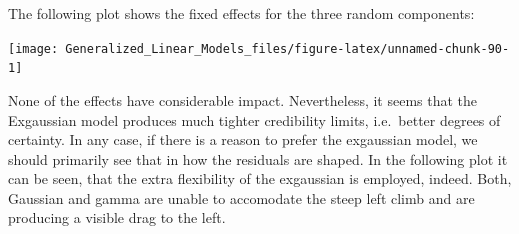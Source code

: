 \documentclass[]{svmono}
\newenvironment{Shaded}{\begin{snugshade}}{\end{snugshade}}
\newcommand{\KeywordTok}[1]{\textcolor[rgb]{0.13,0.29,0.53}{\textbf{#1}}}
\newcommand{\DataTypeTok}[1]{\textcolor[rgb]{0.13,0.29,0.53}{#1}}
\newcommand{\DecValTok}[1]{\textcolor[rgb]{0.00,0.00,0.81}{#1}}
\newcommand{\FloatTok}[1]{\textcolor[rgb]{0.00,0.00,0.81}{#1}}
\newcommand{\StringTok}[1]{\textcolor[rgb]{0.31,0.60,0.02}{#1}}
\newcommand{\OperatorTok}[1]{\textcolor[rgb]{0.81,0.36,0.00}{\textbf{#1}}}
\newcommand{\NormalTok}[1]{#1}
\begin{document}
The following plot shows the fixed effects for the three random
components:

\begin{Shaded}
\end{Shaded}

\texttt{[image: Generalized\_Linear\_Models\_files/figure-latex/unnamed-chunk-90-1]}

None of the effects have considerable impact. Nevertheless, it seems
that the Exgaussian model produces much tighter credibility limits,
i.e.~better degrees of certainty. In any case, if there is a reason to
prefer the exgaussian model, we should primarily see that in how the
residuals are shaped. In the following plot it can be seen, that the
extra flexibility of the exgaussian is employed, indeed. Both, Gaussian
and gamma are unable to accomodate the steep left climb and are
producing a visible drag to the left.

\begin{Shaded}
\end{Shaded}
\end{document}
